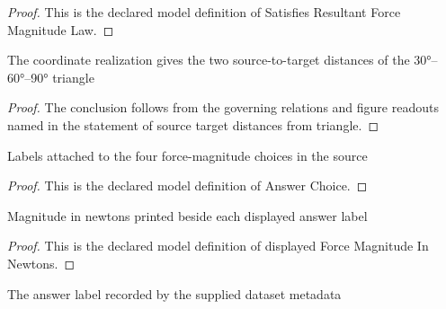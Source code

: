 \begin{proof}
  This is the declared model definition of Satisfies Resultant Force Magnitude Law.
\end{proof}
\begin{lemma}
  \label{lem:physics:phyx-mini-0907:phyxminiproblems-problemphyxmini0907-source-target-distances-from-triangle}
  The coordinate realization gives the two source-to-target distances of the 30°--60°--90° triangle
\end{lemma}
\begin{proof}
  The conclusion follows from the governing relations and figure readouts named in the statement of source target distances from triangle.
\end{proof}
\begin{definition}
  \label{def:physics:phyx-mini-0907:phyxminiproblems-problemphyxmini0907-answerchoice}
  Labels attached to the four force-magnitude choices in the source
\end{definition}
\begin{proof}
  This is the declared model definition of Answer Choice.
\end{proof}
\begin{definition}
  \label{def:physics:phyx-mini-0907:phyxminiproblems-problemphyxmini0907-displayedforcemagnitudeinnewtons}
  Magnitude in newtons printed beside each displayed answer label
\end{definition}
\begin{proof}
  This is the declared model definition of displayed Force Magnitude In Newtons.
\end{proof}
\begin{definition}
  \label{def:physics:phyx-mini-0907:phyxminiproblems-problemphyxmini0907-recordeddatasetanswer}
  The answer label recorded by the supplied dataset metadata
\end{definition}
